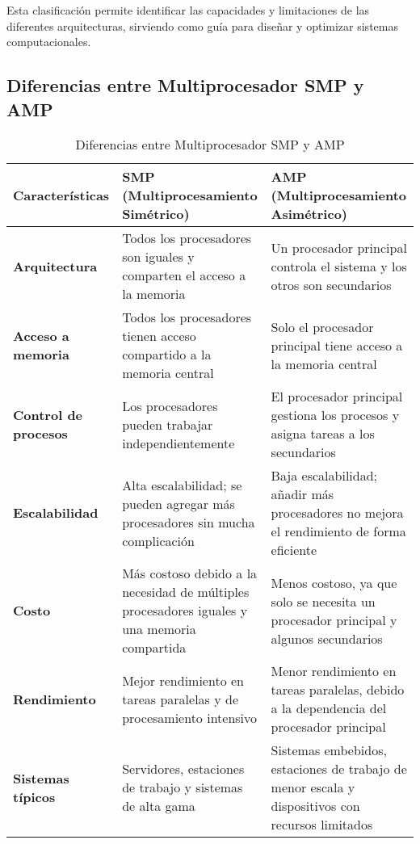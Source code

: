 \documentclass[a4paper,12pt]{article}
\begin{document}
Esta clasificación permite identificar las capacidades y limitaciones de las diferentes arquitecturas, sirviendo como guía para diseñar y optimizar sistemas computacionales.


\subsection{Diferencias entre Multiprocesador SMP y AMP}

\begin{table}[H]
\centering
\begin{tabular}{|p{4cm}|p{6cm}|p{5cm}|}
\hline
\textbf{Características}        & \textbf{SMP (Multiprocesamiento Simétrico)}  & \textbf{AMP (Multiprocesamiento Asimétrico)}  \\ \hline
\textbf{Arquitectura}           & Todos los procesadores son iguales y comparten el acceso a la memoria & Un procesador principal controla el sistema y los otros son secundarios  \\ \hline
\textbf{Acceso a memoria}       & Todos los procesadores tienen acceso compartido a la memoria central  & Solo el procesador principal tiene acceso a la memoria central  \\ \hline
\textbf{Control de procesos}    & Los procesadores pueden trabajar independientemente & El procesador principal gestiona los procesos y asigna tareas a los secundarios \\ \hline
\textbf{Escalabilidad}          & Alta escalabilidad; se pueden agregar más procesadores sin mucha complicación  & Baja escalabilidad; añadir más procesadores no mejora el rendimiento de forma eficiente \\ \hline
\textbf{Costo}                  & Más costoso debido a la necesidad de múltiples procesadores iguales y una memoria compartida  & Menos costoso, ya que solo se necesita un procesador principal y algunos secundarios \\ \hline
\textbf{Rendimiento}            & Mejor rendimiento en tareas paralelas y de procesamiento intensivo  & Menor rendimiento en tareas paralelas, debido a la dependencia del procesador principal \\ \hline
\textbf{Sistemas típicos}       & Servidores, estaciones de trabajo y sistemas de alta gama  & Sistemas embebidos, estaciones de trabajo de menor escala y dispositivos con recursos limitados \\ \hline
\end{tabular}
\caption{Diferencias entre Multiprocesador SMP y AMP}
\end{table}
\end{document}
